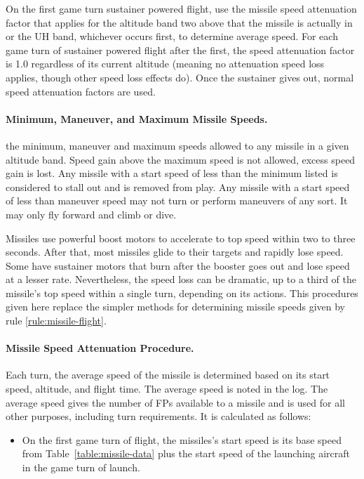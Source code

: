 \begin{advancedrules}
{On the first game turn sustainer powered flight, use the missile speed attenuation factor that applies for the altitude band two above that the missile is actually in or the UH band, whichever occurs first, to determine average speed. For each game turn of sustainer powered flight after the first, the speed attenuation factor is 1.0 regardless of its current altitude (meaning no attenuation speed loss applies, though other speed loss effects do). Once the sustainer gives out, normal speed attenuation factors are used.

\paragraph{Minimum, Maneuver, and Maximum Missile Speeds.}  the minimum, maneuver and maximum speeds allowed to any missile in a given altitude band. Speed gain above the maximum speed is not allowed, excess speed gain is lost. Any missile with a start speed of less than the minimum listed is considered to stall out and is removed from play. Any missile with a start speed of less than maneuver speed may not turn or perform maneuvers of any sort. It may only fly forward and climb or dive.

}{

Missiles use powerful boost motors to accelerate to top speed within two to three seconds. After that, most missiles glide to their targets and rapidly lose speed. Some have sustainer motors that burn after the booster goes out and lose speed at a lesser rate. Nevertheless, the speed loss can be dramatic, up to a third of the missile’s top speed within a single turn, depending on its actions. This procedures given here replace the simpler methods for determining missile speeds given by rule \ref{rule:missile-flight}.

\paragraph{Missile Speed Attenuation Procedure.}
Each turn, the average speed of the missile is determined based on its start speed, altitude, and flight time. The average speed is noted in the log. The average speed gives the number of FPs available to a missile and is used for all other purposes, including turn requirements. It is calculated as follows:
\begin{itemize}
\item 
On the first game turn of flight, the missiles’s start speed is its base speed from Table~\ref{table:missile-data} plus the start speed of the launching aircraft in the game turn of launch.


\end{itemize}}
\end{advancedrules}
